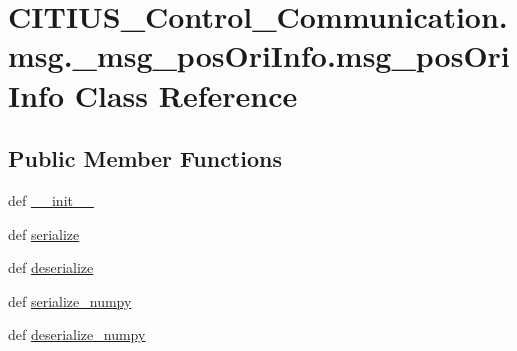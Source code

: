 \hypertarget{class_c_i_t_i_u_s___control___communication_1_1msg_1_1__msg__pos_ori_info_1_1msg__pos_ori_info}{\section{\-C\-I\-T\-I\-U\-S\-\_\-\-Control\-\_\-\-Communication.\-msg.\-\_\-msg\-\_\-pos\-Ori\-Info.\-msg\-\_\-pos\-Ori\-Info \-Class \-Reference}
\label{class_c_i_t_i_u_s___control___communication_1_1msg_1_1__msg__pos_ori_info_1_1msg__pos_ori_info}
}
\subsection*{\-Public \-Member \-Functions}
\begin{DoxyCompactItemize}
\item 
def \hyperlink{class_c_i_t_i_u_s___control___communication_1_1msg_1_1__msg__pos_ori_info_1_1msg__pos_ori_info_a5487bfbd7760a0c825fe11a8d7c5185f}{\-\_\-\-\_\-init\-\_\-\-\_\-}
\item 
def \hyperlink{class_c_i_t_i_u_s___control___communication_1_1msg_1_1__msg__pos_ori_info_1_1msg__pos_ori_info_a500be756dee45f0ac1958024fcf45000}{serialize}
\item 
def \hyperlink{class_c_i_t_i_u_s___control___communication_1_1msg_1_1__msg__pos_ori_info_1_1msg__pos_ori_info_aba12d70137a558b6bda724c12ef51891}{deserialize}
\item 
def \hyperlink{class_c_i_t_i_u_s___control___communication_1_1msg_1_1__msg__pos_ori_info_1_1msg__pos_ori_info_aac4ce5c88b624cfd5fbe8f13f6bf3d57}{serialize\-\_\-numpy}
\item 
def \hyperlink{class_c_i_t_i_u_s___control___communication_1_1msg_1_1__msg__pos_ori_info_1_1msg__pos_ori_info_a62750bf9d57234955d1b4e834ad06b51}{deserialize\-\_\-numpy}
\end{DoxyCompactItemize}

